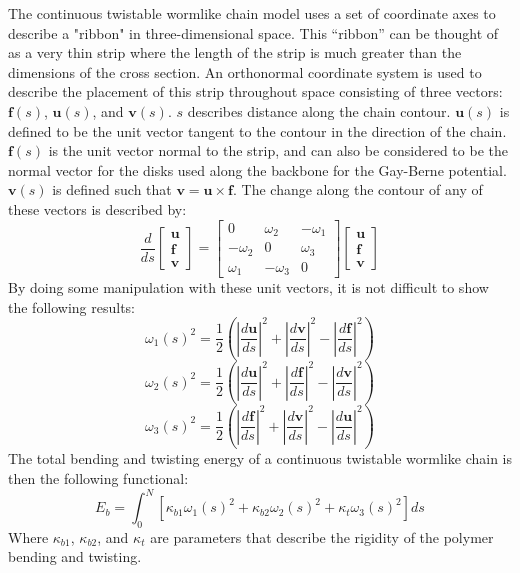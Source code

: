 \documentclass[11pt]{article}
\begin{document}
The continuous twistable wormlike chain model uses a set of coordinate axes to describe a "ribbon" in three-dimensional space. This ``ribbon'' can be thought of as a very thin strip where the length of the strip is much greater than the dimensions of the cross section. An orthonormal coordinate system is used to describe the placement of this strip throughout space consisting of three vectors: $\textbf{f}(s)$, $\textbf{u}(s)$, and $\textbf{v}(s)$. $s$ describes distance along the chain contour. $\textbf{u}(s)$ is defined to be the unit vector tangent to the contour in the direction of the chain. $\textbf{f}(s)$ is the unit vector normal to the strip, and can also be considered to be the normal vector for the disks used along the backbone for the Gay-Berne potential. $\textbf{v}(s)$ is defined such that $\textbf{v} = \textbf{u} \times \textbf{f}$. The change along the contour of any of these vectors is described by:
\begin{equation*}
\frac{d}{ds} \left[ \begin{array}{c}
\textbf{u} \\ \textbf{f} \\ \textbf{v}  
\end{array} \right] = \begin{bmatrix}
0 & \omega_2 & -\omega_1 \\ -\omega_2 & 0 & \omega_3 \\ \omega_1 & -\omega_3 & 0
\end{bmatrix} \left[ \begin{array}{c}
\textbf{u} \\ \textbf{f} \\ \textbf{v} 
\end{array} \right]
\end{equation*}
By doing some manipulation with these unit vectors, it is not difficult to show the following results:
\begin{equation*}
\omega_1(s)^2 = \frac{1}{2} \left( \left| \frac{d \textbf{u}}{ds}\right|^2 + \left| \frac{d \textbf{v}}{ds}\right|^2 - \left| \frac{d \textbf{f}}{ds}\right|^2 \right)
\end{equation*}
\begin{equation*}
\omega_2(s)^2 = \frac{1}{2} \left( \left| \frac{d \textbf{u}}{ds}\right|^2 + \left| \frac{d \textbf{f}}{ds}\right|^2 - \left| \frac{d \textbf{v}}{ds}\right|^2 \right) 
\end{equation*}
\begin{equation*}
\omega_3(s)^2 = \frac{1}{2} \left( \left| \frac{d \textbf{f}}{ds}\right|^2 + \left| \frac{d \textbf{v}}{ds}\right|^2 - \left| \frac{d \textbf{u}}{ds}\right|^2 \right)
\end{equation*}
The total bending and twisting energy of a continuous twistable wormlike chain is then the following functional:
\begin{equation*}
E_{b} = \int_0^N \left[ \kappa_{b1} \omega_1(s)^2 + \kappa_{b2} \omega_2(s)^2 + \kappa_t \omega_3(s)^2 \right] ds
\end{equation*}
Where $\kappa_{b1}$, $\kappa_{b2}$, and $\kappa_t$ are parameters that describe the rigidity of the polymer bending and twisting. 
\end{document}
